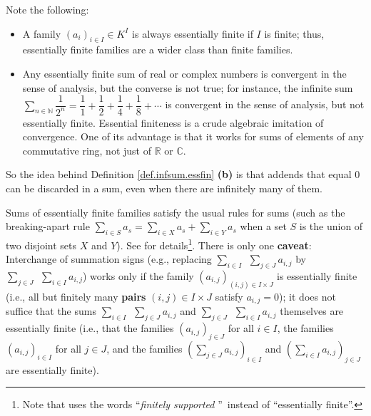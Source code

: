 Note the following:

\begin{itemize}
\item A family $\left(  a_{i}\right)  _{i\in I}\in K^{I}$ is always
essentially finite if $I$ is finite; thus, essentially finite families are a
wider class than finite families.

\item Any essentially finite sum of real or complex numbers is convergent in
the sense of analysis, but the converse is not true; for instance, the
infinite sum $\sum_{n\in\mathbb{N}}\dfrac{1}{2^{n}}=\dfrac{1}{1}+\dfrac{1}%
{2}+\dfrac{1}{4}+\dfrac{1}{8}+\cdots$ is convergent in the sense of analysis,
but not essentially finite. Essential finiteness is a crude algebraic
imitation of convergence. One of its advantage is that it works for sums of
elements of any commutative ring, not just of $\mathbb{R}$ or $\mathbb{C}$.
\end{itemize}

So the idea behind Definition \ref{def.infsum.essfin} \textbf{(b)} is that
addends that equal $0$ can be discarded in a sum, even when there are
infinitely many of them. \medskip

Sums of essentially finite families satisfy the usual rules for sums (such as
the breaking-apart rule $\sum_{i\in S}a_{s}=\sum_{i\in X}a_{s}+\sum_{i\in
Y}a_{s}$ when a set $S$ is the union of two disjoint sets $X$ and $Y$). See
\cite[\S 2.14.15]{detnotes} for details\footnote{Note that \cite[\S 2.14.15]%
{detnotes} uses the words \textquotedblleft\emph{finitely supported}%
\textquotedblright\ instead of \textquotedblleft essentially
finite\textquotedblright.}. There is only one \textbf{caveat}: Interchange of
summation signs (e.g., replacing $\sum_{i\in I}\ \ \sum_{j\in J}a_{i,j}$ by
$\sum_{j\in J}\ \ \sum_{i\in I}a_{i,j}$) works only if the family $\left(
a_{i,j}\right)  _{\left(  i,j\right)  \in I\times J}$ is essentially finite
(i.e., all but finitely many \textbf{pairs} $\left(  i,j\right)  \in I\times
J$ satisfy $a_{i,j}=0$); it does not suffice that the sums $\sum_{i\in
I}\ \ \sum_{j\in J}a_{i,j}$ and $\sum_{j\in J}\ \ \sum_{i\in I}a_{i,j}$
themselves are essentially finite (i.e., that the families $\left(
a_{i,j}\right)  _{j\in J}$ for all $i\in I$, the families $\left(
a_{i,j}\right)  _{i\in I}$ for all $j\in J$, and the families $\left(
\sum_{j\in J}a_{i,j}\right)  _{i\in I}$ and $\left(  \sum_{i\in I}%
a_{i,j}\right)  _{j\in J}$ are essentially finite).


